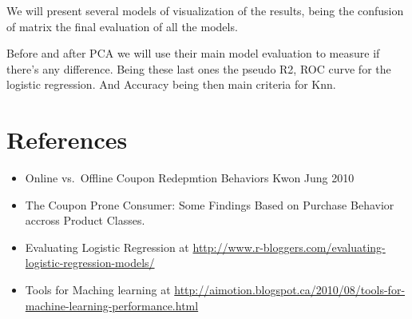 \documentclass[]{article}
\begin{document}
We will present several models of visualization of the results, being
the confusion of matrix the final evaluation of all the models.

Before and after PCA we will use their main model evaluation to measure
if there's any difference. Being these last ones the pseudo R2, ROC
curve for the logistic regression. And Accuracy being then main criteria
for Knn.

\section{References}\label{references}

\begin{itemize}
\item
  Online vs.~Offline Coupon Redepmtion Behaviors Kwon Jung 2010
\item
  The Coupon Prone Consumer: Some Findings Based on Purchase Behavior
  accross Product Classes.
\item
  Evaluating Logistic Regression at
  \url{http://www.r-bloggers.com/evaluating-logistic-regression-models/}
\item
  Tools for Maching learning at
  \url{http://aimotion.blogspot.ca/2010/08/tools-for-machine-learning-performance.html}
\end{itemize}
\end{document}
